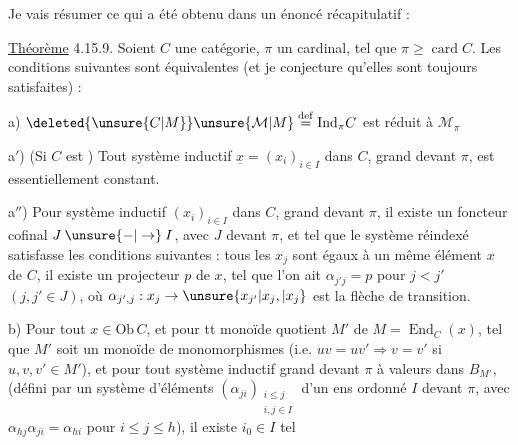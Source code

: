 
Je vais résumer ce qui a été obtenu dans un énoncé récapitulatif :

\uline{Théorème} 4.15.9. Soient $C$ une  catégorie, $\pi$ un cardinal, tel que $\pi\geq\operatorname{card} C$. Les conditions suivantes sont équivalentes (et je conjecture qu'elles sont toujours satisfaites) :

a) $\deleted{\unsure{C|M}}\unsure{\mathcal M|M}\overset{\mathrm{def}}{=}\mathrm{Ind}_\pi C$ est réduit à $\mathcal M_\pi$

a$'$) (Si $C$ est ) Tout système inductif $\underline{x}=(x_i)_{i\in I}$ dans $C$, grand devant $\pi$, est essentiellement constant.

a$''$) Pour  système inductif $(x_i)_{i\in I}$ dans $C$, grand devant $\pi$, il existe un foncteur cofinal $J\mathbin{\unsure{-|\to}}I$, avec $J$   devant $\pi$, et tel que le système réindexé  satisfasse les
conditions suivantes :  tous les $x_j$ sont égaux à un même élément $x$ de $C$,  il existe un projecteur $p$ de $x$, tel que l'on ait $\alpha_{j'j}=p$ pour $j<j'$ $(j,j'\in J)$, où $\alpha_{j',j}:x_j\to\unsure{x_{j'}|x_j,|x_j}$ est la flèche de transition.

b) Pour tout $x\in\mathrm{Ob}\,C$, et pour tt monoïde quotient $M'$ de $M=\operatorname{End}_C(x)$, tel que $M'$ soit un monoïde de monomorphismes (i.e. $uv=uv'\Longrightarrow v=v'$ si $u,v,v'\in M'$), et pour tout système
inductif grand devant $\pi$ à valeurs dans $B_{M'}$, (défini par un système d'éléments $(\alpha_{ji})_{\substack{i\leq j\\i,j\in I}}$ d'un ens ordonné $I$  devant $\pi$, avec $\alpha_{hj}\alpha_{ji}=\alpha_{hi}$ pour $i\leq j\leq h$), il existe $i_0\in I$ tel
